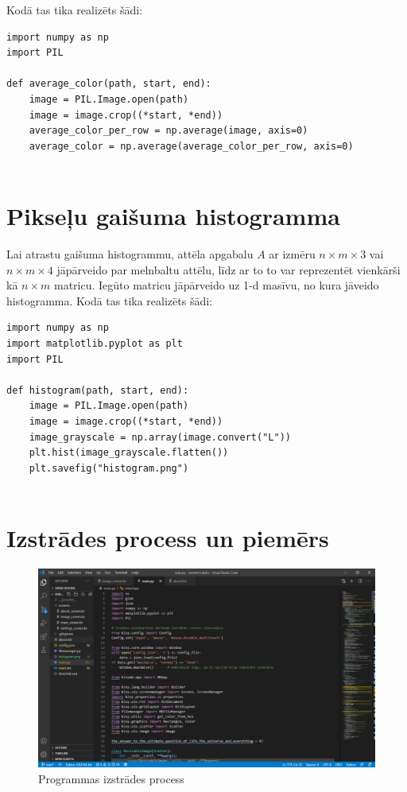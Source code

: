 \documentclass{article}
\begin{document}
Kodā tas tika realizēts šādi:
\begin{lstlisting}
import numpy as np
import PIL

def average_color(path, start, end):
    image = PIL.Image.open(path)
    image = image.crop((*start, *end))
    average_color_per_row = np.average(image, axis=0)
    average_color = np.average(average_color_per_row, axis=0)
    
\end{lstlisting}
\section{Pikseļu gaišuma histogramma}
Lai atrastu gaišuma histogrammu, attēla apgabalu $A$ ar izmēru $n\times m\times 3$ vai $n\times m \times 4$ jāpārveido par melnbaltu attēlu, līdz ar to to var reprezentēt vienkārši kā $n\times m$ matricu. Iegūto matricu jāpārveido uz 1-d masīvu, no kura jāveido histogramma. Kodā tas tika realizēts šādi:
\begin{lstlisting}
import numpy as np
import matplotlib.pyplot as plt
import PIL

def histogram(path, start, end):
    image = PIL.Image.open(path)
    image = image.crop((*start, *end))
    image_grayscale = np.array(image.convert("L"))
    plt.hist(image_grayscale.flatten())
    plt.savefig("histogram.png")
    
\end{lstlisting}

\pagebreak
\section{Izstrādes process un piemērs}
\begin{figure}[htbp]
    \centering
    \includegraphics[width=\textwidth]{process.png}
    \caption{Programmas izstrādes process}
    \label{fig:my_label}
\end{figure}
\end{document}
